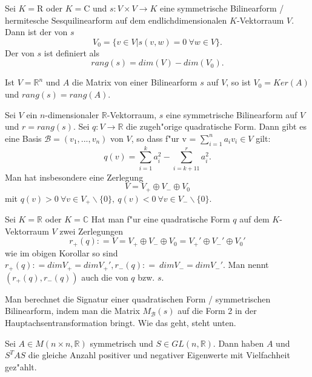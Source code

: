 \documentclass[8pt, a4paper, twocolumn, landscape]{article}
\begin{document}
\begin{definition} Sei $K = \mathrm{R}$ oder $K = \mathrm{C}$ und  $s : V \times V \rightarrow K$ eine symmetrische Bilinearform / hermitesche Sesquilinearform auf dem endlichdimensionalen $K$-Vektorraum $V$. Dann ist der  von $s$ 
$$
V_0 = \{ v \in V | s(v, w) = 0 \ \forall w \in V \}.
$$
Der  von $s$ ist definiert als
$$
rang(s) = dim (V) - dim (V_0).
$$
\end{definition}

\begin{remark} Ist $V = \mathbb{R}^n$ und $A$ die Matrix von einer Bilinearform $s$ auf $V$, so ist $V_0 = Ker(A)$ und $rang(s) = rang(A)$.
\end{remark}

\begin{corollary}
Sei $V$ ein $n$-dimensionaler $\mathbb{R}$-Vektorraum, $s$ eine symmetrische Bilinearform auf $V$ und $r = rang(s)$. Sei $q : V \rightarrow \mathbb{R}$ die zugeh"orige quadratische Form.
Dann gibt es eine Basis $\mathcal{B} = (v_1, ..., v_n)$ von $V$, so dass f"ur v = $\sum\limits_{i=1}^n a_iv_i \in V$ gilt:
$$
q(v) = \sum\limits_{i=1}^k a_i^2 - \sum\limits_{i=k + 11}^r a_i^2.
$$
Man hat insbesondere eine Zerlegung
$$
V = V_+ \oplus V_- \oplus V_0
$$
mit $q(v) > 0 \ \forall v \in V_+ \backslash \{0\}, \ q(v) < 0 \ \forall v \in V_- \backslash \{0\}.$
\end{corollary}

\begin{theorem} 
Sei $K = \mathbb{R}$ oder $K = \mathbb{C}$ Hat man f"ur eine quadratische Form $q$ auf dem $K$-Vektorraum $V$ zwei Zerlegungen 
$$
r_+(q) : = V = V_+ \oplus V_- \oplus V_0 =  V_+' \oplus V_-' \oplus V_0 '
$$
wie im obigen Korollar so sind $r_+(q) : =  dim V_+ = dim V_+ ', r_-(q) : = \ dim V_- = dim V_-'$. Man nennt $(r_+(q), r_-(q))$ auch die  von $q$ bzw. $s$.
\end{theorem}

\begin{remark}
Man berechnet die Signatur einer quadratischen Form / symmetrischen Bilinearform, indem man die Matrix $M_\mathcal{B}(s)$ auf die Form 2 in der Hauptachsentransformation bringt. Wie das geht, steht unten.
\end{remark}


\begin{corollary}
Sei $A \in M(n \times n, \mathbb{R})$ symmetrisch und $S \in GL(n, \mathbb{R})$. Dann haben $A$ und $S^T A S$ die gleiche Anzahl positiver und negativer Eigenwerte mit Vielfachheit gez"ahlt.
\end{corollary}
\end{document}

